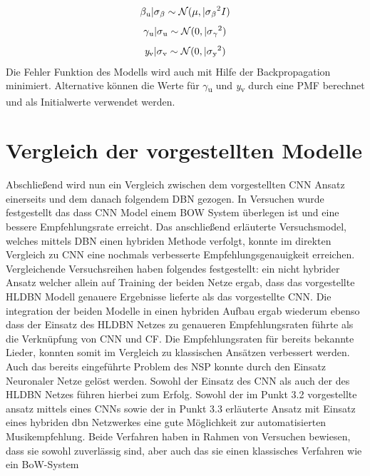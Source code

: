 \documentclass[twosided,a4,10pt]{article}
\begin{document}
\begin{multicols}{2}
\begin{equation*}
		\centering
		\beta\textsubscript{u}|\sigma\textsubscript{$\beta$}\sim\mathcal{N}(\mu,|\sigma\textsubscript{$\beta$}\textsuperscript{2}I)
		\end{equation*}
		\begin{equation*}
		\centering
		\gamma\textsubscript{u}|\sigma\textsubscript{u}\sim\mathcal{N}(0,|\sigma\textsubscript{$\gamma$}\textsuperscript{2})
		\end{equation*}
		\begin{equation*}
		\centering
		\textit{y}\textsubscript{v}|\sigma\textsubscript{v}\sim\mathcal{N}(0,|\sigma\textsubscript{y}\textsuperscript{2})
		\end{equation*}\newline
		Die Fehler Funktion des Modells wird auch mit Hilfe der Backpropagation minimiert. Alternative können  die Werte für $\gamma$\textsubscript{u} und \textit{y}\textsubscript{v} durch eine PMF berechnet und als Initialwerte verwendet werden. \cite{wang}
		\section{Vergleich der vorgestellten Modelle}
		Abschließend wird nun ein Vergleich zwischen dem vorgestellten CNN Ansatz einerseits und dem danach folgendem DBN gezogen. In Versuchen \cite{oord} wurde festgestellt das dass CNN Model einem BOW System überlegen ist und eine bessere Empfehlungsrate erreicht. Das anschließend erläuterte  Versuchsmodel, welches mittels DBN einen hybriden Methode verfolgt, konnte im direkten Vergleich zu CNN eine nochmals verbesserte Empfehlungsgenauigkeit erreichen. Vergleichende Versuchsreihen \cite{wang} haben folgendes festgestellt: ein nicht hybrider Ansatz welcher allein auf Training der beiden Netze ergab, dass das vorgestellte HLDBN Modell genauere Ergebnisse lieferte als das vorgestellte CNN. Die integration der beiden Modelle in einen hybriden Aufbau ergab wiederum ebenso dass der Einsatz des HLDBN Netzes zu genaueren Empfehlungsraten führte als die Verknüpfung von CNN und CF. Die Empfehlungsraten für bereits bekannte Lieder, konnten somit im Vergleich zu klassischen Ansätzen verbessert werden. Auch das bereits eingeführte Problem des NSP konnte durch den Einsatz Neuronaler Netze gelöst werden.  Sowohl der Einsatz des CNN als auch der des HLDBN Netzes führen hierbei zum Erfolg.
		Sowohl der im Punkt 3.2 vorgestellte ansatz mittels eines CNNs sowie der in Punkt 3.3 erläuterte Ansatz mit Einsatz eines hybriden dbn Netzwerkes eine gute Möglichkeit zur automatisierten Musikempfehlung. Beide Verfahren haben in Rahmen von Versuchen bewiesen, dass sie sowohl zuverlässig sind, aber auch das sie einen klassisches Verfahren wie ein BoW-System 
		
		
	\end{multicols}
\end{document}
